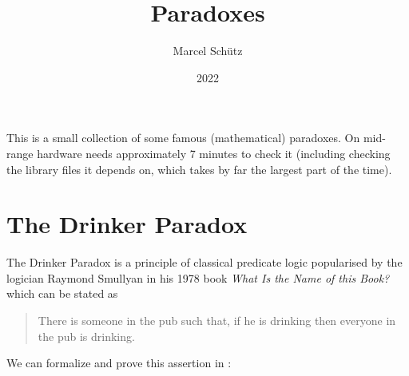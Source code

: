 \documentclass{article}
\title{Paradoxes}
\author{Marcel Schütz}
\date{2022}
\begin{document}
  \maketitle

  \noindent This is a small collection of some famous (mathematical) paradoxes.
  On mid-range hardware \Naproche needs approximately 7 minutes to check it
  (including checking the library files it depends on, which takes by far the
  largest part of the time).

  \begin{forthel}
  \end{forthel}

  \section*{The Drinker Paradox}

  The Drinker Paradox is a principle of classical predicate logic popularised by
  the logician Raymond Smullyan in his 1978 book \textit{What Is the Name of
  this Book?} which can be stated as

  \begin{quotation}
    \noindent There is someone in the pub such that, if he is drinking then
    everyone in the pub is drinking.
  \end{quotation}

  \noindent We can formalize and prove this assertion in \Naproche:
\end{document}

